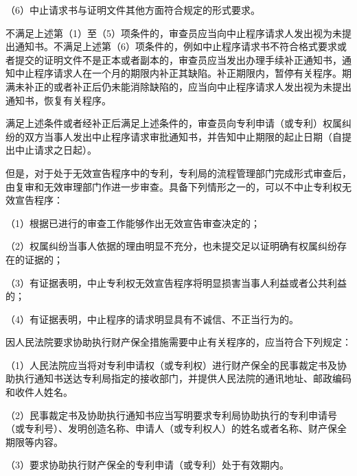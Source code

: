 {\setlength{\parindent}{17.1bp}（6）中止请求书与证明文件其他方面符合规定的形式要求。\par}

不满足上述第（1）至（5）项条件的，审查员应当向中止程序请求人发出视为未提出通知书。不满足上述第（6）项条件的，例如中止程序请求书不符合格式要求或者提交的证明文件不是正本或者副本的，审查员应当发出办理手续补正通知书，通知中止程序请求人在一个月的期限内补正其缺陷。补正期限内，暂停有关程序。期满未补正的或者补正后仍未能消除缺陷的，应当向中止程序请求人发出视为未提出通知书，恢复有关程序。

满足上述条件或者经补正后满足上述条件的，审查员向专利申请（或专利）权属纠纷的双方当事人发出中止程序请求审批通知书，并告知中止期限的起止日期（自提出中止请求之日起）。

但是，对于处于无效宣告程序中的专利，专利局的流程管理部门完成形式审查后，由复审和无效审理部门作进一步审查。具备下列情形之一的，可以不中止专利权无效宣告程序：

{\setlength{\parindent}{17.1bp}（1）根据已进行的审查工作能够作出无效宣告审查决定的；\par}

{\setlength{\parindent}{17.1bp}（2）权属纠纷当事人依据的理由明显不充分，也未提交足以证明确有权属纠纷存在的证据的；\par}

{\setlength{\parindent}{17.1bp}（3）有证据表明，中止专利权无效宣告程序将明显损害当事人利益或者公共利益的；\par}

{\setlength{\parindent}{17.1bp}（4）有证据表明，中止程序的请求明显具有不诚信、不正当行为的。\par}

因人民法院要求协助执行财产保全措施需要中止有关程序的，应当符合下列规定：

{\setlength{\parindent}{17.1bp}（1）人民法院应当将对专利申请权（或专利权）进行财产保全的民事裁定书及协助执行通知书送达专利局指定的接收部门，并提供人民法院的通讯地址、邮政编码和收件人姓名。\par}

{\setlength{\parindent}{17.1bp}（2）民事裁定书及协助执行通知书应当写明要求专利局协助执行的专利申请号（或专利号）、发明创造名称、申请人（或专利权人）的姓名或者名称、财产保全期限等内容。\par}

{\setlength{\parindent}{17.1bp}（3）要求协助执行财产保全的专利申请（或专利）处于有效期内。\par}

